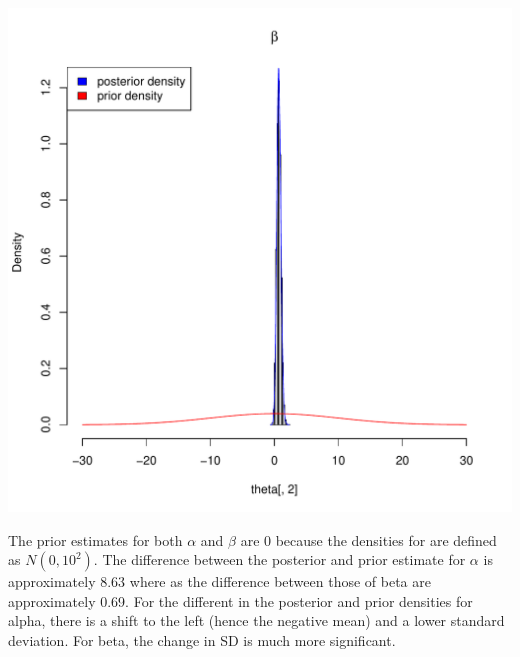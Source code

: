 \documentclass{article}\usepackage[]{graphicx}\usepackage[]{color}
\makeatletter
\newenvironment{kframe}{%
 \def\at@end@of@kframe{}%
 \ifinner\ifhmode%
  \def\at@end@of@kframe{\end{minipage}}%
  \begin{minipage}{\columnwidth}%
 \fi\fi%
 \def\FrameCommand##1{\hskip\@totalleftmargin \hskip-\fboxsep
 \colorbox{shadecolor}{##1}\hskip-\fboxsep
     \hskip-\linewidth \hskip-\@totalleftmargin \hskip\columnwidth}%
 \MakeFramed {\advance\hsize-\width
   \@totalleftmargin\z@ \linewidth\hsize
   \@setminipage}}%
 {\par\unskip\endMakeFramed%
 \at@end@of@kframe}
\newenvironment{knitrout}{}{} %
\makeatother
\begin{document}
\begin{knitrout}
\begin{kframe}
\end{kframe}
\includegraphics[width=1\linewidth]{figure/unnamed-chunk-12-2} 

\end{knitrout}
The prior estimates for both $\alpha$ and $\beta$ are 0 because the densities for are defined as $N(0,10^{2})$. The difference between the posterior and prior estimate for $\alpha$ is approximately 8.63 where as the difference between those of beta are approximately 0.69. 
For the different in the posterior and prior densities for alpha, there is a shift to the left (hence the negative mean) and a lower standard deviation. For beta, the change in SD is much more significant. 
\end{document}
